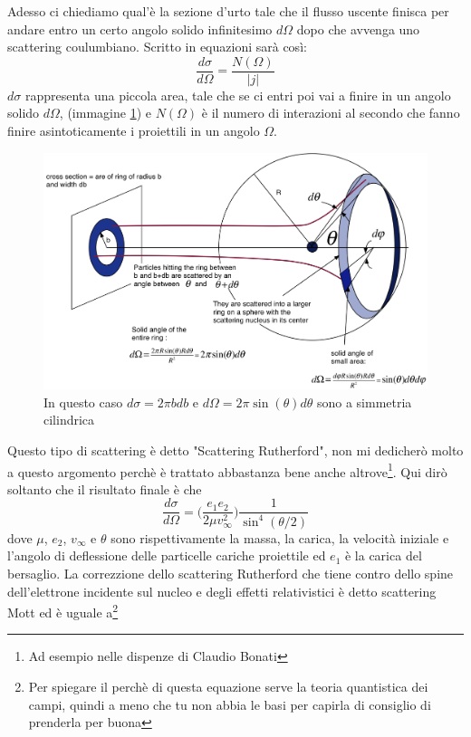 \documentclass[11pt,a4paper]{report}
\begin{document}
		Adesso ci chiediamo qual'è la sezione d'urto tale che il flusso uscente finisca per andare entro un certo angolo solido infinitesimo $d\Omega$ dopo che avvenga uno scattering coulumbiano. Scritto in equazioni sarà così:
		\begin{equation}
			\frac{d\sigma}{d\Omega}=\frac{N(\Omega)}{|j|}
			\label{eq:sez_diff}
		\end{equation}
		$d\sigma$ rappresenta una piccola area, tale che se ci entri poi vai a finire in un angolo solido $d\Omega$, (immagine \ref{fig:rut1}) e $N(\Omega)$ è il numero di interazioni al secondo che fanno finire asintoticamente i proiettili in un angolo $\Omega$.\newline
		\begin{figure}
			\centering
    		\includegraphics[width=\linewidth]{Immagini/solid_angle.png}
    		\caption{In questo caso $d\sigma=2\pi b db$ e $d\Omega=2\pi \sin(\theta)d\theta$ sono a simmetria cilindrica}
    		\label{fig:rut1}
		\end{figure}
		Questo tipo di scattering è detto "Scattering Rutherford", non mi dedicherò molto a questo argomento perchè è trattato abbastanza bene anche altrove\footnote{Ad esempio nelle dispenze di Claudio Bonati}. Qui dirò soltanto che il risultato finale è che
		\begin{equation}
			\frac{d\sigma}{d\Omega}=\Big(\frac{e_1e_2}{2\mu v_\infty^2 }\Big)\frac{1}{\sin^4(\theta/2)}
		\end{equation}
		dove $\mu$, $e_2$, $v_\infty$ e $\theta$ sono rispettivamente la massa, la carica, la velocità iniziale e l'angolo di deflessione delle particelle cariche proiettile ed $e_1$ è la carica del bersaglio.\newline
		La correzzione dello scattering Rutherford che tiene contro dello spine dell'elettrone incidente sul nucleo e degli effetti relativistici è detto scattering Mott ed è uguale a\footnote{Per spiegare il perchè di questa equazione serve la teoria quantistica dei campi, quindi a meno che tu non abbia le basi per capirla di consiglio di prenderla per buona}
\end{document}
